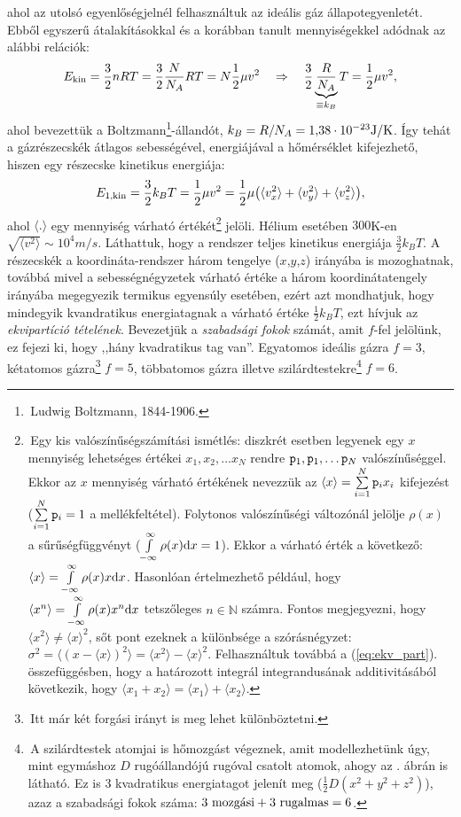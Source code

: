 ahol az utolsó egyenlőségjelnél felhasználtuk az ideális gáz állapotegyenletét. Ebből egyszerű átalakításokkal és a korábban tanult mennyiségekkel adódnak az alábbi relációk:
\begin{align}
    E_{\textnormal{kin}} = \frac 32 nRT = \frac 32 \frac{N}{N_A} RT = N\frac 12 \mu v^2 \quad\Rightarrow\quad \frac 32 \underbrace{\frac{R}{N_A}}_{\equiv k_B} T = \frac 12 \mu v^2,
\end{align}
ahol bevezettük a Boltzmann\footnote{\,Ludwig Boltzmann, 1844-1906.}-állandót, $k_B = R/N_A = 1{,}38\cdot 10^{-23} \textnormal{J/K}$. Így tehát a gázrészecskék átlagos sebességével, energiájával a hőmérséklet kifejezhető, hiszen egy részecske kinetikus energiája:
\begin{align}\label{eq:ekv_part}
    E_{\textnormal{1,kin}} = \frac 32 k_B T = \frac 12 \mu v^2 = \frac 12\mu \big(\langle v_x^2 \rangle + \langle v_y^2 \rangle + \langle v_z^2 \rangle\big),
\end{align}
ahol $\langle . \rangle$ egy mennyiség várható értékét\footnote{\,Egy kis valószínűségszámítási ismétlés: diszkrét esetben legyenek egy $x$ mennyiség lehetséges értékei $x_1,x_2,\dots x_N$ rendre $\mathtt p_1,\mathtt p_1,\dots \mathtt p_N$ valószínűséggel. Ekkor az $x$ mennyiség várható értékének nevezzük az $\langle x \rangle = \sum\limits_{i=1}^N \mathtt p_i x_i$ kifejezést ($\sum\limits_{i=1}^N \mathtt p_i = 1$ a mellékfeltétel). Folytonos valószínűségi változónál jelölje $\rho(x)$ a sűrűségfüggvényt ($\int\limits_{-\infty}^\infty \rho(x) \mathrm{d} x = 1$). Ekkor a várható érték a következő: $\langle x \rangle = \int\limits_{-\infty}^\infty \rho(x)x \mathrm{d} x$. Hasonlóan értelmezhető például, hogy $\langle x^n \rangle = \int\limits_{-\infty}^\infty \rho(x)x^n \mathrm{d} x$ tetszőleges $n\in \mathbb N$ számra. Fontos megjegyezni, hogy $\langle x^2\rangle \neq \langle x \rangle ^2$, sőt pont ezeknek a különbsége a szórásnégyzet: $\sigma^2 = \langle (x - \langle x \rangle)^2 \rangle =  \langle x^2\rangle - \langle x \rangle ^2$. Felhasználtuk továbbá a (\ref{eq:ekv_part}). összefüggésben, hogy a határozott integrál integrandusának additivitásából következik, hogy $\langle x_1+x_2 \rangle = \langle x_1 \rangle + \langle x_2 \rangle$.} jelöli. Hélium esetében $300$K-en $\sqrt{\langle v^2 \rangle} \sim 10^4 m/s$. Láthattuk, hogy a rendszer teljes kinetikus energiája $\frac 32 k_BT$. A részecskék a koordináta-rendszer három tengelye ($x$,$y$,$z$) irányába is mozoghatnak, továbbá mivel a sebességnégyzetek várható értéke a három koordinátatengely irányába megegyezik termikus egyensúly esetében, ezért azt mondhatjuk, hogy mindegyik kvandratikus energiatagnak a várható értéke $\frac 12 k_BT$, ezt hívjuk az \emph{ekvipartíció tételének}. Bevezetjük a \emph{szabadsági fokok} számát, amit $f$-fel jelölünk, ez fejezi ki, hogy ,,hány kvadratikus tag van''. Egyatomos ideális gázra $f=3$, kétatomos gázra\footnote{\,Itt már két forgási irányt is meg lehet különböztetni.} $f=5$, többatomos gázra illetve szilárdtestekre\footnote{\,A szilárdtestek atomjai is hőmozgást végeznek, amit modellezhetünk úgy, mint egymáshoz $D$ rugóállandójú rugóval csatolt atomok, ahogy az . ábrán is látható. Ez is 3 kvadratikus energiatagot jelenít meg ($\frac 12 D(x^2+y^2+z^2)$), azaz a szabadsági fokok száma: $3 \textnormal{ mozgási} + 3 \textnormal{ rugalmas} = 6$.} $f=6$.
